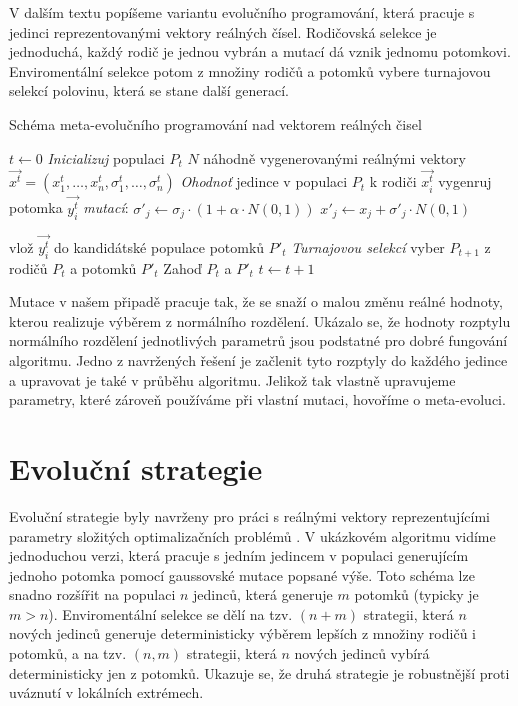 \documentclass[12pt,fleqn,a4paper,proc]{article}
\begin{document}
V dalším textu popíšeme variantu evolučního programování, která pracuje s jedinci reprezentovanými vektory reálných čísel. Rodičovská selekce je jednoduchá, každý rodič je jednou vybrán a mutací dá vznik jednomu potomkovi. Enviromentální selekce potom z množiny rodičů a potomků vybere turnajovou selekcí polovinu, která se stane další generací. 

\begin{algorithm}
\caption{Schéma meta-evolučního programování nad vektorem reálných čisel}
\label{obrep}
\begin{algorithmic}
\State $t \gets 0$
\State \emph{Inicializuj} populaci $P_t$ $N$ náhodně vygenerovanými reálnými vektory $\vec{x^t}=(x_1^t,\dots,x_n^t,\sigma_1^t,\dots,\sigma_n^t)$
\State \emph{Ohodnoť} jedince v populaci $P_t$
\State 	k rodiči $\vec{x_i^t}$ vygenruj potomka $\vec{y_i^t}$ \emph{mutací}:
\State $\sigma'_j \gets \sigma_j \cdot (1+\alpha \cdot N(0,1))$
\State $x'_j \gets x_j + \sigma'_j \cdot N(0,1)$

\EndFor
\State vlož $\vec{y_i^t}$ do kandidátské populace potomků $P'_t$
\EndFor
\State 	\emph{Turnajovou selekcí} vyber $P_{t+1}$ z rodičů $P_t$ a potomků $P'_t$
\State 	Zahoď $P_t$ a $P'_t$
\State $t \gets t+1$
\EndWhile
\EndProcedure
\end{algorithmic}
\end{algorithm}
 
Mutace v našem připadě pracuje tak, že se snaží o malou změnu reálné hodnoty, kterou realizuje výběrem z normálního rozdělení. Ukázalo se, že hodnoty rozptylu normálního rozdělení jednotlivých parametrů jsou podstatné pro dobré fungování algoritmu. Jedno z navržených řešení je začlenit tyto rozptyly do každého jedince a upravovat je také v průběhu algoritmu. Jelikož tak vlastně upravujeme parametry, které zároveň používáme při vlastní mutaci, hovoříme o meta-evoluci.




\section{Evoluční strategie}

Evoluční strategie byly navrženy pro práci s reálnými vektory reprezentujícími parametry složitých optimalizačních problémů \cite{schwefel}. V ukázkovém algoritmu vidíme jednoduchou verzi, která pracuje s jedním jedincem v populaci generujícím jednoho potomka pomocí gaussovské mutace popsané výše. Toto schéma lze snadno rozšířit na populaci $n$ jedinců, která generuje $m$ potomků (typicky je $m>n$). Enviromentální selekce se dělí na tzv. $(n+m)$ strategii, která $n$ nových jedinců generuje deterministicky výběrem lepších z množiny rodičů i potomků, a na tzv. $(n,m)$ strategii, která $n$ nových jedinců vybírá deterministicky jen z potomků. Ukazuje se, že druhá strategie je robustnější proti uváznutí v lokálních extrémech.
\end{document}
